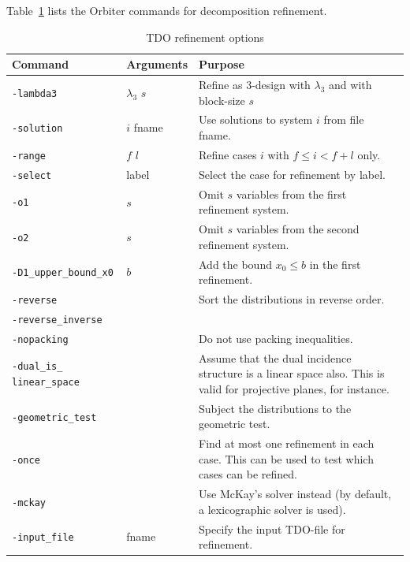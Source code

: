 Table~\ref{tab:tdo:refine} lists the Orbiter commands for decomposition refinement.
\begin{table}
	\begin{center}
	\begin{tabular}{|p{4cm}|p{3cm}|p{7cm}|}
		\hline
		Command & Arguments & Purpose \\
		\hline
		\hline
		\verb'-lambda3' & $\lambda_3$ $s$ &  Refine as 3-design with $\lambda_3$ and with block-size $s$  \\
		\hline
		\verb'-solution' & $i$ fname  &  Use solutions to system $i$ from file fname. \\
		\hline
		\verb'-range' & $f$ $l$  & Refine cases $i$ with $f \le i < f + l$ only.   \\
		\hline
		\verb'-select' & label   &  Select the case for refinement by label.  \\
		\hline
		\verb'-o1' &  $s$ & Omit $s$ variables from the first refinement system.   \\
		\hline
		\verb'-o2' & $s$  &  Omit $s$ variables from the second refinement system.   \\
		\hline
		\verb'-D1_upper_bound_x0' &  $b$ &  Add the bound $x_0\le b$ in the first refinement. \\
		\hline
		\verb'-reverse' &   & Sort the distributions in reverse order.   \\
		\hline
		\verb'-reverse_inverse' &   &    \\
		\hline
		\verb'-nopacking' &   &  Do not use packing inequalities.  \\
		\hline
		\verb'-dual_is_' \verb'linear_space' &   &  Assume that the dual incidence structure is a linear space also. This is valid for projective planes, for instance.  \\
		\hline
		\verb'-geometric_test' &   &  Subject the distributions to the geometric test.  \\
		\hline
		\verb'-once' &   &  Find at most one refinement in each case. This can be used to test which cases can be refined. \\
		\hline
		\verb'-mckay' &   &  Use McKay's solver instead (by default, a lexicographic solver is used).  \\
		\hline
		\verb'-input_file' & fname  &  Specify the input TDO-file for refinement.  \\
		\hline
		\end{tabular}
	\end{center}
	\caption{\label{tab:tdo:refine}TDO refinement options}
	\end{table}

